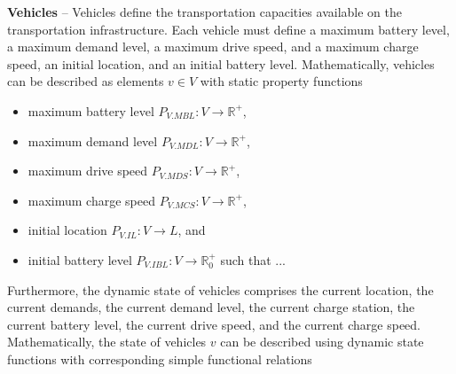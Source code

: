 \documentclass[graybox]{svmult}
\begin{document}
\noindent
\textbf{Vehicles}
--
Vehicles define the transportation capacities available on the transportation infrastructure.
Each vehicle must define a maximum battery level, a maximum demand level, a maximum drive speed, and a maximum charge speed, an initial location, and an initial battery level.
Mathematically, vehicles can be described as elements $v \in V$ with static property functions
\begin{itemize}
	\item maximum battery level $P_{V.MBL}: V \rightarrow \mathbb{R}^+$,
	\item maximum demand level $P_{V.MDL}: V \rightarrow \mathbb{R}^+$,
	\item maximum drive speed $P_{V.MDS}: V \rightarrow \mathbb{R}^+$,
	\item maximum charge speed $P_{V.MCS}: V \rightarrow \mathbb{R}^+$,
	\item initial location $P_{V.IL}: V \rightarrow L$, and
	\item initial battery level $P_{V.IBL}: V \rightarrow \mathbb{R}_0^+$ such that ...
\end{itemize}
Furthermore, the dynamic state of vehicles comprises the current location, the current demands, the current demand level, the current charge station, the current battery level, the current drive speed, and the current charge speed.
Mathematically, the state of vehicles $v$ can be described using dynamic state functions with corresponding simple functional relations
\end{document}
